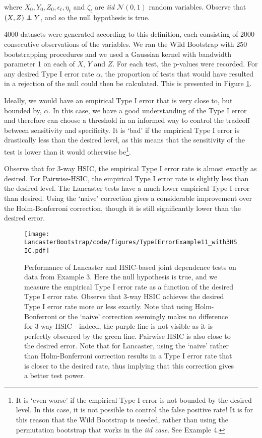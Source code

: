 \documentclass[12pt]{article}
\newcommand\independent{\protect\mathpalette{\protect\independenT}{\perp}}
\def\independenT#1#2{\mathrel{\rlap{$#1#2$}\mkern2mu{#1#2}}}
\numberwithin{claim}{section}
\numberwithin{lemma}{section}
\numberwithin{theorem}{section}
\begin{document}
where $X_0, Y_0, Z_0, \epsilon_t, \eta_t$ and $\zeta_t$ are \emph{iid} $\mathcal{N}(0,1)$ random variables. Observe that  $(X,Z) \independent Y$, and so the null hypothesis is true.

4000 datasets were generated according to this definition, each consisting of 2000 consecutive observations of the variables. We ran the Wild Bootstrap with 250 bootstrapping procedures and we used a Gaussian kernel with bandwidth parameter 1 on each of $X$, $Y$ and $Z$. For each test, the p-values were recorded. For any desired Type I error rate $\alpha$, the proportion of tests that would have resulted in a rejection of the null could then be calculated. This is presented in Figure \ref{fig:ex3}.

Ideally, we would have an empirical Type I error that is very close to, but bounded by, $\alpha$. In this case, we have a good understanding of the Type I error and therefore can choose a threshold in an informed way to control the tradeoff between sensitivity and specificity. It is `bad' if the empirical Type I error is drastically less than the desired level, as this means that the sensitivity of the test is lower than it would otherwise be\footnote{It is `even worse' if the empirical Type I error is not bounded by the desired level. In this case, it is not possible to control the false positive rate! It is for this reason that the Wild Bootstrap is needed, rather than using the permutation bootstrap that works in the \emph{iid case}. See Example 4.}.

Observe that for 3-way HSIC, the empirical Type I error rate is almost exactly as desired. For Pairwise-HSIC, the empirical Type I error rate is slightly less than the desired level. The Lancaster tests have a much lower empirical Type I error than desired. Using the `naive' correction gives a considerable improvement over the Holm-Bonferroni correction, though it is still significantly lower than the desired error.



\begin{figure}[htbp]
  \centering
  \texttt{[image: LancasterBootstrap/code/figures/TypeIErrorExample11\_with3HSIC.pdf]}
  \caption{Performance of Lancaster and HSIC-based joint dependence tests on data from Example 3. Here the null hypothesis is true, and we measure the empirical Type I error rate as a function of the desired Type I error rate. Observe that 3-way HSIC achieves the desired Type I error rate more or less exactly. Note that using Holm-Bonferroni or the `naive' correction seemingly makes no difference for 3-way HSIC - indeed, the purple line is not visible as it is perfectly obscured by the green line. Pairwise HSIC is also close to the desired error. Note that for Lancaster, using the `naive' rather than Holm-Bonferroni correction results in a Type I error rate that is closer to the desired rate, thus implying that this correction gives a better test power.}
  \label{fig:ex3}
\end{figure}
\end{document}
